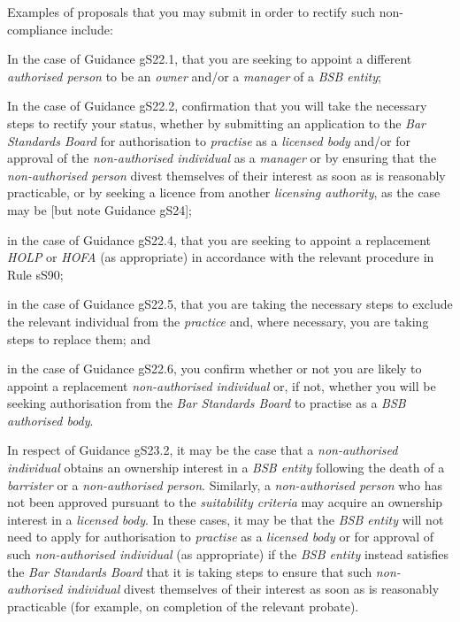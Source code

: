 Examples of proposals that you may submit in order to rectify such
non-compliance include:\nl\item In the case of Guidance gS22.1, that you are seeking to appoint a
different \emph{authorised person} to be an \emph{owner} and/or a
\emph{manager} of a \emph{BSB entity};
\item In the case of Guidance gS22.2, confirmation that you will take the
necessary steps to rectify your status, whether by submitting an
application to the \emph{Bar Standards Board} for authorisation to
\emph{practise} as a \emph{licensed body} and/or for approval of the
\emph{non-authorised individual} as a \emph{manager} or by ensuring that
the \emph{non-authorised person} divest themselves of their interest as
soon as is reasonably practicable, or by seeking a licence from another
\emph{licensing authority}, as the case may be {[}but note Guidance
gS24{]};
\item in the case of Guidance gS22.4, that you are seeking to appoint a
replacement \emph{HOLP} or \emph{HOFA} (as appropriate) in accordance
with the relevant procedure in Rule sS90;
\item in the case of Guidance gS22.5, that you are taking the necessary
steps to exclude the relevant individual from the \emph{practice} and,
where necessary, you are taking steps to replace them; and
\item in the case of Guidance gS22.6, you confirm whether or not you are
likely to appoint a replacement \emph{non-authorised individual} or, if
not, whether you will be seeking authorisation from the \emph{Bar
Standards Board} to practise as a \emph{BSB authorised body}.
\ln
{}

In respect of Guidance gS23.2, it may be the case that a
\emph{non-authorised individual} obtains an ownership interest in a
\emph{BSB entity} following the death of a \emph{barrister} or a
\emph{non-authorised person}. Similarly, a \emph{non-authorised person}
who has not been approved pursuant to the \emph{suitability criteria}
may acquire an ownership interest in a \emph{licensed body}. In these
cases, it may be that the \emph{BSB entity} will not need to apply for
authorisation to \emph{practise} as a \emph{licensed body} or for
approval of such \emph{non-authorised individual} (as appropriate) if
the \emph{BSB entity} instead satisfies the \emph{Bar Standards Board}
that it is taking steps to ensure that such \emph{non-authorised
individual} divest themselves of their interest as soon as is reasonably
practicable (for example, on completion of the relevant probate).

